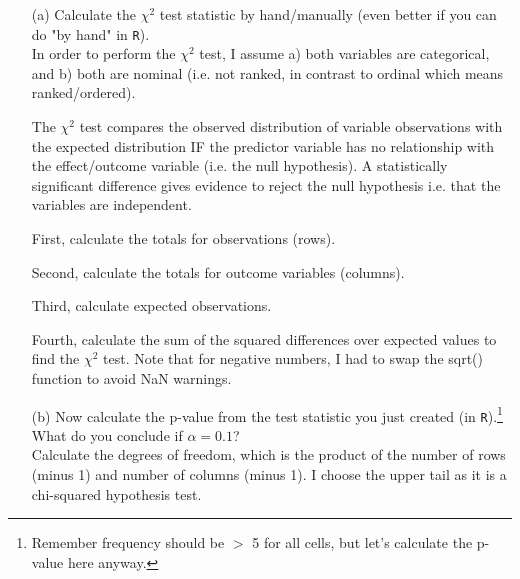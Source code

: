 \documentclass[12pt,letterpaper]{article}
\begin{document}
\begin{enumerate}
	
	\item [(a)]
	Calculate the $\chi^2$ test statistic by hand/manually (even better if you can do "by hand" in \texttt{R}).\\
	
	\noindent In order to perform the $\chi^2$ test, I assume a) both variables are categorical, and b) both are nominal (i.e. not ranked, in contrast to ordinal which means ranked/ordered).
	
	\noindent The $\chi^2$ test compares the observed distribution of variable observations with the expected distribution IF the predictor variable has no relationship with the effect/outcome variable (i.e. the null hypothesis). A statistically significant difference gives evidence to reject the null hypothesis i.e. that the variables are independent.
	
	\noindent First, calculate the totals for observations (rows).
	
	
	
	\noindent Second,  calculate the totals for outcome variables (columns).
	
	
	
	\noindent Third, calculate expected observations.
	
	
	
	\noindent Fourth, calculate the sum of the squared differences over expected values to find the $\chi^2$ test. Note that for negative numbers, I had to swap the sqrt() function to avoid NaN warnings.
	
	
	
	\item [(b)]
	Now calculate the p-value from the test statistic you just created (in \texttt{R}).\footnote{Remember frequency should be $>$ 5 for all cells, but let's calculate the p-value here anyway.}  What do you conclude if $\alpha = 0.1$?\\
	
	\noindent Calculate the degrees of freedom, which is the product of the number of rows (minus 1) and number of columns (minus 1). I choose the upper tail as it is a chi-squared hypothesis test.

	
	

\end{enumerate}
\end{document}
